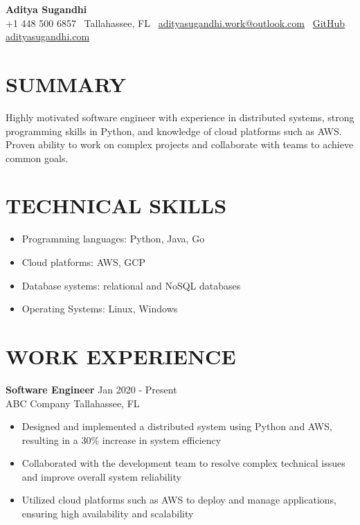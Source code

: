 \documentclass[letterpaper,10pt]{article}
\newcommand{\resumeItem}[1]{\item\small #1}
\newcommand{\resumeSubheading}[4]{
  \vspace{6pt}
  \noindent
  \textbf{#1} \hfill {\footnotesize #2} \\
  [-1pt]
  \noindent
  \small #3 \hfill {\small #4}
  \vspace{3pt}
}
\newcommand{\resumeItemsStart}{\vspace{-2pt}\begin{itemize}}
\newcommand{\resumeItemsEnd}{\end{itemize}\vspace{6pt}}
\begin{document}
\begin{center}
{\huge\textbf{Aditya Sugandhi}} \\
+1 448 500 6857 \textbar\ \textcolor{metablue}{Tallahassee, FL} \textbar\
\href{mailto:adityasugandhi.work@outlook.com}{adityasugandhi.work@outlook.com} \textbar\
\href{https://github.com/adityasugandhi}{GitHub}
\textbar \href{https://adityasugandhi.com}{adityasugandhi.com}
\end{center}
\vspace{-12pt}

\section{\textcolor{metablue}{SUMMARY}}
\small
\vspace{-6pt}
Highly motivated software engineer with experience in distributed systems, strong programming skills in Python, and knowledge of cloud platforms such as AWS. Proven ability to work on complex projects and collaborate with teams to achieve common goals.

\vspace{-9pt}

\section{\textcolor{metablue}{TECHNICAL SKILLS}}
\vspace{-5pt}
\small
\begin{itemize}
\resumeItem{Programming languages: Python, Java, Go}
\resumeItem{Cloud platforms: AWS, GCP}
\resumeItem{Database systems: relational and NoSQL databases}
\resumeItem{Operating Systems: Linux, Windows}
\end{itemize}
\vspace{-10pt}


\section{\textcolor{metablue}{WORK EXPERIENCE}}
\vspace{-12pt}

\resumeSubheading{Software Engineer}{Jan 2020 - Present}{ABC Company}{Tallahassee, FL}
\resumeItemsStart
\resumeItem{Designed and implemented a distributed system using Python and AWS, resulting in a 30\% increase in system efficiency}
\resumeItem{Collaborated with the development team to resolve complex technical issues and improve overall system reliability}
\resumeItem{Utilized cloud platforms such as AWS to deploy and manage applications, ensuring high availability and scalability}
\resumeItemsEnd
\end{document}
